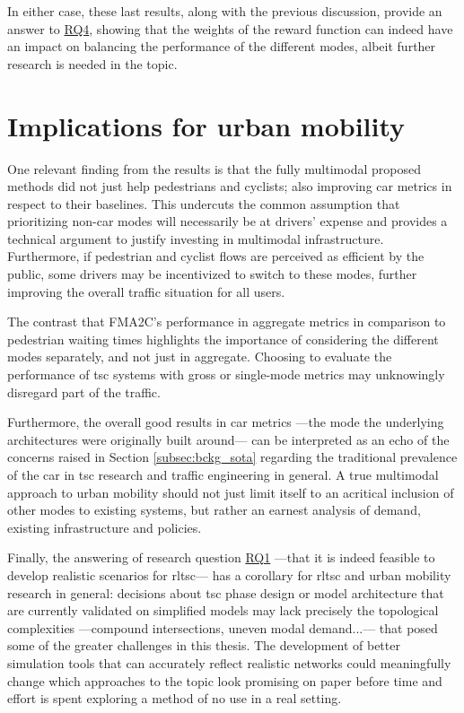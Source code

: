 In either case, these last results, along with the previous discussion, provide an answer to \hyperref[sec:rqs]{RQ4}, showing that the weights of the reward function can indeed have an impact on balancing the performance of the different modes, albeit further research is needed in the topic.

\section{Implications for urban mobility} 

One relevant finding from the results is that the fully multimodal proposed methods did not just help pedestrians and cyclists; also improving car metrics in respect to their baselines. This undercuts the common assumption that prioritizing non-car modes will necessarily be at drivers' expense and provides a technical argument to justify investing in multimodal infrastructure. Furthermore, if pedestrian and cyclist flows are perceived as efficient by the public, some drivers may be incentivized to switch to these modes, further improving the overall traffic situation for all users.

The contrast that FMA2C's performance in aggregate metrics in comparison to pedestrian waiting times highlights the importance of considering the different modes separately, and not just in aggregate. Choosing to evaluate the performance of \gls{tsc} systems with gross or single-mode metrics may unknowingly disregard part of the traffic.

Furthermore, the overall good results in car metrics —the mode the underlying architectures were originally built around— can be interpreted as an echo of the concerns raised in Section \ref{subsec:bckg_sota} regarding the traditional prevalence of the car in \gls{tsc} research and traffic engineering in general. A true multimodal approach to urban mobility should not just limit itself to an acritical inclusion of other modes to existing systems, but rather an earnest analysis of demand, existing infrastructure and policies.

Finally, the answering of research question \hyperref[sec:rqs]{RQ1} —that it is indeed feasible to develop realistic scenarios for \gls{rltsc}— has a corollary for \gls{rltsc} and urban mobility research in general: decisions about \gls{tsc} phase design or model architecture that are currently validated on simplified models may lack precisely the topological complexities —compound intersections, uneven modal demand...— that posed some of the greater challenges in this thesis. The development of better simulation tools that can accurately reflect realistic networks could meaningfully change which approaches to the topic look promising on paper before time and effort is spent exploring a method of no use in a real setting.


